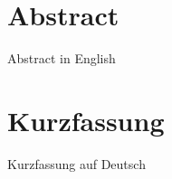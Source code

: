 


\newcommand{\TODO}[1]{\marginpar{\color{red}\emph{\small{{\bf TODO: } #1}}}}

\newpage
\chapter*{Abstract}
Abstract in English

\chapter*{Kurzfassung}
Kurzfassung auf Deutsch



\linespread{1.25}\selectfont


\tableofcontents %
\listoffigures  %
\listoftables
\blankpage
\blankpage







\blankpage

\begin{appendices}
	\blankpage
	
	
	
	
	
	
\end{appendices}


\blankpage

